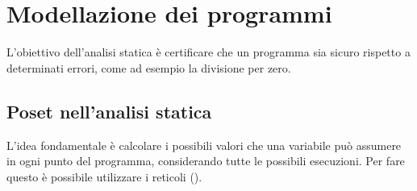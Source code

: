 \section{Modellazione dei programmi}
L'obiettivo dell'analisi statica è certificare che un programma sia sicuro
rispetto a determinati errori, come ad esempio la divisione per zero.

\subsection{Poset nell'analisi statica}

L'idea fondamentale è calcolare i possibili valori che una variabile può
assumere in ogni punto del programma, considerando tutte le possibili
esecuzioni.
Per fare questo è possibile utilizzare i reticoli ().


